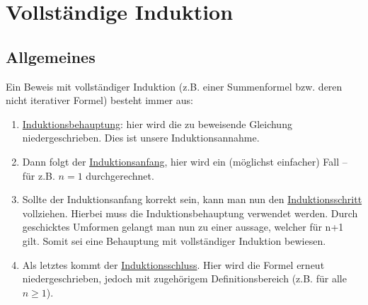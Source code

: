\section{Vollständige Induktion}
\subsection{Allgemeines}
Ein Beweis mit vollständiger Induktion (z.B. einer Summenformel bzw. deren nicht iterativer Formel) besteht immer aus:

\begin{enumerate}[$\bullet$]
\item \underline{Induktionsbehauptung}: hier wird die zu beweisende Gleichung niedergeschrieben. Dies ist unsere Induktionsannahme.
\item Dann folgt der \underline{Induktionsanfang}, hier wird ein (möglichst einfacher) Fall -- für z.B. $n=1$ durchgerechnet.
\item Sollte der Induktionsanfang korrekt sein, kann man nun den \underline{Induktionsschritt} vollziehen. Hierbei muss die Induktionsbehauptung verwendet werden. Durch geschicktes Umformen gelangt man nun zu einer aussage, welcher für n+1 gilt. Somit sei eine Behauptung mit vollständiger Induktion bewiesen.
\item Als letztes kommt der \underline{Induktionsschluss}. Hier wird die Formel erneut niedergeschrieben, jedoch mit zugehörigem Definitionsbereich (z.B. für alle $n \geq 1$).
\end{enumerate}

